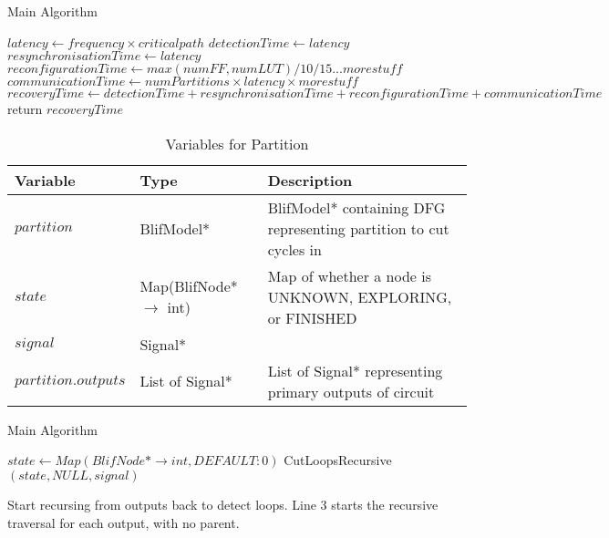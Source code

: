 \documentclass[12pt,draft,oneside]{article} %
\begin{document}
\begin{algorithm}
   \caption{Main Algorithm}\label{main}
   \begin{algorithmic}[1]
            \State $latency \gets frequency\times{}criticalpath$
            \State $detectionTime \gets latency$
            \State $resynchronisationTime \gets latency$
            \State $reconfigurationTime \gets max(numFF, numLUT)/10/15...more stuff$
            \State $communicationTime \gets numPartitions\times{}latency\times{}more stuff$
            \State $recoveryTime \gets detectionTime+resynchronisationTime+reconfigurationTime+communicationTime$
            \State return $recoveryTime$
         \EndProcedure
   \end{algorithmic}
\end{algorithm}

\begin{table}
    \begin{center}
        \begin{tabular}{lll}
        \toprule
        Variable & Type & Description\\
        \midrule
        $partition$ & BlifModel* & BlifModel* containing DFG representing partition to cut cycles in\\
        $state$ & Map(BlifNode* $\to$ int) & Map of whether a node is UNKNOWN, EXPLORING, or FINISHED\\
        $signal$ & Signal* & \\
        $partition.outputs$ & List of Signal* & List of Signal* representing primary outputs of circuit\\
        \bottomrule
        \end{tabular}
        \caption{Variables for Partition}
        \label{varPart}
    \end{center}
\end{table}
\begin{algorithm}
   \caption{Main Algorithm}\label{main}
   \begin{algorithmic}[1]
            \State $state \gets Map(BlifNode* \to int, DEFAULT: 0)$
               \State CutLoopsRecursive$(state, NULL, signal)$
            \EndFor
         \EndProcedure
   \end{algorithmic}
\end{algorithm}
Start recursing from outputs back to detect loops.
Line 3 starts the recursive traversal for each output, with no parent.
\end{document}

